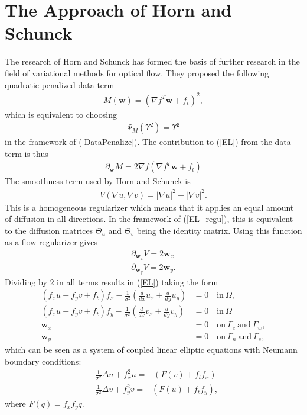 \chapter{The Approach of Horn and Schunck}
The research of Horn and Schunck has formed the basis of further research in the field of variational methods for optical flow. They proposed the following quadratic penalized data term
\begin{align}
M(\textbf{w}) = (\nabla f^T \textbf{w} + f_t)^2,
\end{align}
which is equivalent to choosing
\begin{align*}
\Psi_M(\Upsilon^2) = \Upsilon^2
\end{align*}
in the framework of (\ref{DataPenalize}). The contribution to (\ref{EL}) from the data term is thus 
\begin{equation}
\begin{aligned}
\partial_{\textbf{w}} M = 2\nabla f(\nabla f ^T  \textbf{w} + f_t)
\end{aligned}
\end{equation}
The smoothness term used by Horn and Schunck is
\begin{align*}
V(\nabla u, \nabla v) = |\nabla u|^2 + |\nabla v|^2.
\end{align*}
This is a homogeneous regularizer which means that it applies an equal amount of diffusion in all directions. In the framework of (\ref{EL_regu}), this is equivalent to the diffusion matrices $\Theta_u$ and $\Theta_v$ being the identity matrix. Using this function as a flow regularizer gives
\begin{align*}
\partial_ {\textbf{w}_{x}} V = 2\textbf{w}_{x} \\
\partial_ {\textbf{w}_{y}} V = 2\textbf{w}_{y}.
\end{align*}
Dividing by 2 in all terms results in (\ref{EL}) taking the form 
\begin{equation}
\label{EL_HS}
\begin{aligned}
(f_x u + f_y v + f_t) f_x - \frac{1}{\sigma^2}(\frac{d}{d x} u_x + \frac{d}{d y} u_y ) &= 0  \quad \text{in} \ \Omega,  \\
(f_x u + f_y v + f_t) f_y - \frac{1}{\sigma^2}(\frac{d}{d x} v_x + \frac{d}{d y} v_y ) &= 0  \quad \text{in} \ \Omega  \\
\textbf{w}_{x} &= 0 \quad \text{on} \ \Gamma_e \ \text{and} \ \Gamma_w, \\
\textbf{w}_{y} &= 0 \quad \text{on} \ \Gamma_n \ \text{and} \ \Gamma_s,
\end{aligned}
\end{equation}
which can be seen as a system of coupled linear elliptic equations with Neumann boundary conditions:
\begin{align*}
-\frac{1}{\sigma^2} \Delta u + f_x ^2 u = - (F(v) + f_tf_x) \\
-\frac{1}{\sigma^2} \Delta v + f_y ^2 v = - (F(u) + f_tf_y) ,
\end{align*}
where $F(q) = f_xf_y q$.


